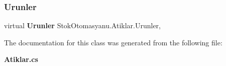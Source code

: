 \mbox{\label{class_stok_otomasyanu_1_1_atiklar_ab111102b416a761d1988fa7120730710}} 
\subsubsection{Urunler}
{\footnotesize\ttfamily virtual \textbf{ Urunler} Stok\+Otomasyanu.\+Atiklar.\+Urunler\hspace{0.3cm}{\ttfamily [get]}, {\ttfamily [set]}}



The documentation for this class was generated from the following file\+:\begin{DoxyCompactItemize}
\item 
\textbf{ Atiklar.\+cs}\end{DoxyCompactItemize}
